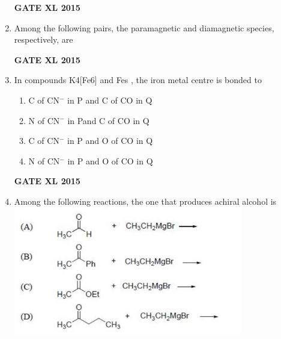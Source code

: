 \documentclass[journal,12pt,onecolumn]{IEEEtran}
\begin{document}
\begin{enumerate}
    \begin{enumerate}
    \end{enumerate}
\begin{flushright}\textbf{GATE XL 2015}\end{flushright}
\item Among the following pairs, the paramagnetic and diamagnetic species, respectively, are
    \begin{enumerate}
    \end{enumerate}
\begin{flushright}\textbf{GATE XL 2015}\end{flushright}
\item In compounds K4[Fe6]  and Fes , the iron metal centre is bonded to
    \begin{enumerate}
            \item C of CN$^-$ in P and C of CO in Q
            \item N of CN$^-$ in Pand C of CO in Q
            \item C of CN$^-$ in P and O of CO in Q
            \item N of CN$^-$ in P and O of CO in Q
    \end{enumerate}
\begin{flushright}\textbf{GATE XL 2015}\end{flushright}
\item  Among the following reactions, the one that produces achiral alcohol  is\\
    \includegraphics[width=10cm]{21}

\end{enumerate}
\end{document}
